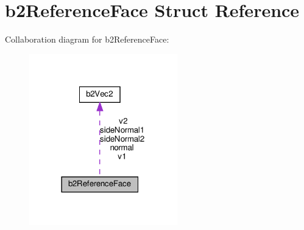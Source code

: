 \hypertarget{structb2ReferenceFace}{}\section{b2\+Reference\+Face Struct Reference}
\label{structb2ReferenceFace}


Collaboration diagram for b2\+Reference\+Face\+:
\nopagebreak
\begin{figure}[H]
\begin{center}
\leavevmode
\includegraphics[width=182pt]{structb2ReferenceFace__coll__graph}
\end{center}
\end{figure}
